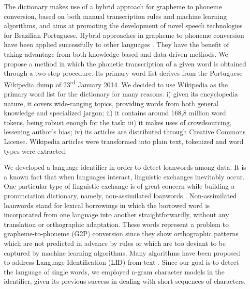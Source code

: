 The dictionary makes use of a hybrid approach for grapheme to phoneme conversion, 
based on both manual transcription rules and machine learning algorithms, and aims at promoting the development 
of novel speech technologies for Brazilian Portuguese. Hybrid approaches in grapheme to phoneme conversion have been applied 
successfully to other languages \cite{Damper1998}\cite{Polyakova2006}\cite{Teixeira2006}\cite{Veiga2013}. They have the benefit of taking advantage from both knowledge-based and 
data-driven methods. We propose a method in which the phonetic transcription of a given word is obtained through
a two-step procedure. Its primary word list derives from the Portuguese Wikipedia 
dump of 23\textsuperscript{rd} January 2014. We decided to use Wikipedia as the primary word list 
for the dictionary for many 
reasons: i) given its encyclopedia nature, it covers wide-ranging topics, providing words from both 
general knowledge and 
specialized jargon; ii) it contains around 168,8 million word tokens, being robust enough for the task; iii) it 
makes uses of crowdsourcing, lessening author's bias; iv) its articles are distributed through Creative Commons 
License. Wikipedia articles were transformed into plain text, tokenized and word types were extracted.

We developed a language identifier in order to detect loanwords among data. 
It is a known fact that when languages interact, linguistic exchanges inevitably occur. 
One particular type of linguistic exchange is of great concern while building a pronunciation
dictionary, namely, non-assimilated loanwords \cite{Bussmann96}. Non-assimilated loanwords stand
for lexical borrowings in which the borrowed word is incorporated from one language into another
straightforwardly, without any translation or orthographic adaptation. These words represent a problem to 
grapheme-to-phoneme (G2P) conversion since they show orthographic patterns which are not predicted in advance by rules or
which are too deviant to be captured by machine learning algorithms. Many algorithms
have been proposed to address Language Identification (LID) from text \cite{Bergsma2012}\cite{Bilcu2006}\cite{Dolf2012}\cite{Zampieri2012}. Since our goal is to detect the language of single words, we employed n-gram character 
models in the identifier, given its previous success in dealing with short sequences of characters. 

